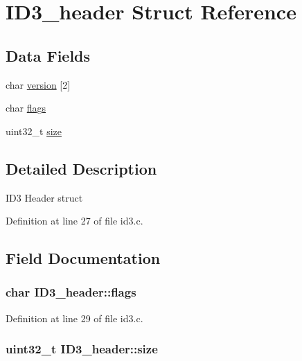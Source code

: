 \hypertarget{structID3__header}{\section{I\-D3\-\_\-header Struct Reference}
\label{structID3__header}
}
\subsection*{Data Fields}
\begin{DoxyCompactItemize}
\item 
char \hyperlink{structID3__header_a9c6baaea989fcde45ea19c40b428a10c}{version} \mbox{[}2\mbox{]}
\item 
char \hyperlink{structID3__header_aa479cfff247f34bc04245d3f2d62e867}{flags}
\item 
uint32\-\_\-t \hyperlink{structID3__header_a61f6e7b223473a203980d8b3374c595d}{size}
\end{DoxyCompactItemize}


\subsection{Detailed Description}
I\-D3 Header struct 

Definition at line 27 of file id3.\-c.



\subsection{Field Documentation}
\hypertarget{structID3__header_aa479cfff247f34bc04245d3f2d62e867}{
\subsubsection[{flags}]{\setlength{\rightskip}{0pt plus 5cm}char I\-D3\-\_\-header\-::flags}}\label{structID3__header_aa479cfff247f34bc04245d3f2d62e867}


Definition at line 29 of file id3.\-c.

\hypertarget{structID3__header_a61f6e7b223473a203980d8b3374c595d}{
\subsubsection[{size}]{\setlength{\rightskip}{0pt plus 5cm}uint32\-\_\-t I\-D3\-\_\-header\-::size}}\label{structID3__header_a61f6e7b223473a203980d8b3374c595d}


